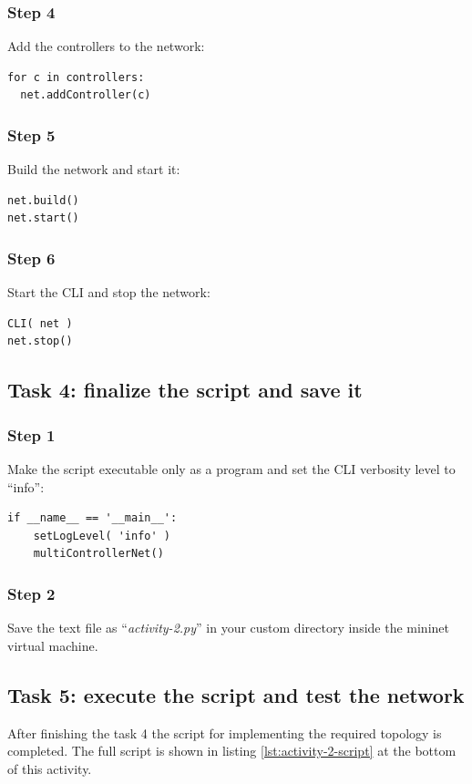 \subsubsection*{Step 4}
Add the controllers to the network:
\begin{lstlisting}
for c in controllers:
  net.addController(c)
\end{lstlisting}

\subsubsection*{Step 5}
Build the network and start it:
\begin{lstlisting}
net.build()
net.start()
\end{lstlisting}

\subsubsection*{Step 6}
Start the CLI and stop the network:
\begin{lstlisting}
CLI( net )
net.stop()
\end{lstlisting}




\subsection*{Task 4: finalize the script and save it}
\subsubsection*{Step 1}
Make the script executable only as a program and set the CLI verbosity level
to ``info'':
\begin{lstlisting}
if __name__ == '__main__':
    setLogLevel( 'info' )
    multiControllerNet()
\end{lstlisting}

\subsubsection*{Step 2}
Save the text file as ``\emph{activity-2.py}'' in your custom directory inside
the mininet virtual machine.






\subsection*{Task 5: execute the script and test the network}
After finishing the task 4 the script for implementing the required topology is
completed. The full script is shown in listing \ref{lst:activity-2-script} at the
bottom of this activity.


